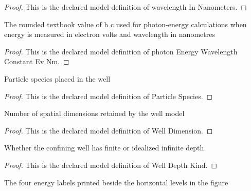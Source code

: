 \begin{proof}
  This is the declared model definition of wavelength In Nanometers.
\end{proof}
\begin{definition}
  \label{def:physics:phyx-mini-0586:phyxminiproblems-problemphyxmini0586-photonenergywavelengthconstantevnm}
  The rounded textbook value of h c used for photon-energy calculations when energy is measured in electron volts and wavelength in nanometres
\end{definition}
\begin{proof}
  This is the declared model definition of photon Energy Wavelength Constant Ev Nm.
\end{proof}
\begin{definition}
  \label{def:physics:phyx-mini-0586:phyxminiproblems-problemphyxmini0586-particlespecies}
  Particle species placed in the well
\end{definition}
\begin{proof}
  This is the declared model definition of Particle Species.
\end{proof}
\begin{definition}
  \label{def:physics:phyx-mini-0586:phyxminiproblems-problemphyxmini0586-welldimension}
  Number of spatial dimensions retained by the well model
\end{definition}
\begin{proof}
  This is the declared model definition of Well Dimension.
\end{proof}
\begin{definition}
  \label{def:physics:phyx-mini-0586:phyxminiproblems-problemphyxmini0586-welldepthkind}
  Whether the confining well has finite or idealized infinite depth
\end{definition}
\begin{proof}
  This is the declared model definition of Well Depth Kind.
\end{proof}
\begin{definition}
  \label{def:physics:phyx-mini-0586:phyxminiproblems-problemphyxmini0586-energylevellabel}
  The four energy labels printed beside the horizontal levels in the figure
\end{definition}
